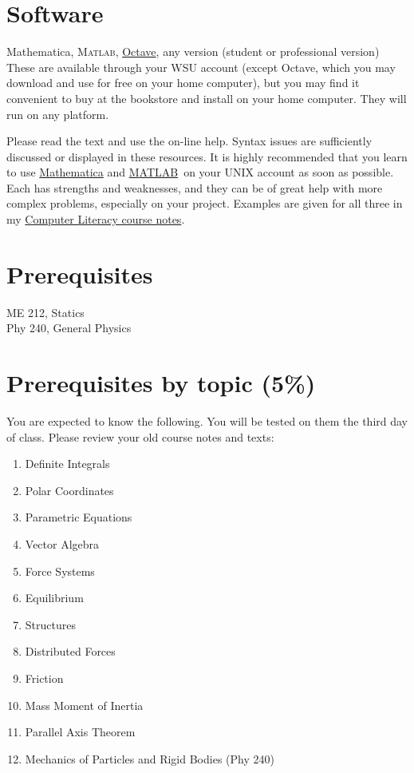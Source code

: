 \documentclass[10pt]{article}
\newcommand{\comp}[1]{{\small\textsf{#1}}}
\newcommand{\matlab}{\href{http://www.mathworks.com}{M{\small ATLAB}}}
\begin{document}
\section*{Software}
\noindent Mathematica, \textsc{Matlab}, \href{http://www.octave.org}{Octave}, any version (student or professional version) \\
These are available through your WSU account (except Octave, which you may download and use for free on your home computer), but you may find it convenient to buy at the bookstore and install on your home computer. They will run on any platform.

Please read the text and use the on-line help.  Syntax issues are sufficiently discussed or displayed in these resources.  It is highly recommended that you learn to use \href{http://www.wolfram.com}{Mathematica} and \matlab\  on your UNIX account as soon as possible. Each has strengths and weaknesses, and they can be of great help with more complex problems, especially on your project. Examples are given for all three in my \href{http://www.cs.wright.edu/~jslater/materials/CompLit.pdf}{Computer Literacy course notes}. 

\section*{Prerequisites}
ME 212, Statics\\
Phy 240, General Physics

\section*{Prerequisites by topic (5\%)}
You are expected to know the following.  You will be tested on them
the third day of class.  Please review your old course notes and texts:
\begin{enumerate}
\setlength{\itemsep}{0pt}
	\item Definite Integrals
	\item Polar Coordinates
	\item Parametric Equations
	\item Vector Algebra
	\item Force Systems
	\item Equilibrium
	\item Structures
	\item Distributed Forces
	\item Friction
	\item Mass Moment of Inertia
	\item Parallel Axis Theorem
	\item Mechanics of Particles and Rigid Bodies (Phy 240)
\end{enumerate}
\end{document}
